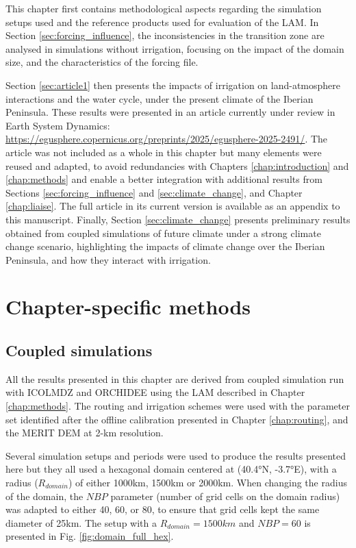 This chapter first contains methodological aspects regarding the simulation setups used and the reference products used for evaluation of the LAM. 
In Section \ref{sec:forcing_influence}, the inconsistencies in the transition zone are analysed in simulations without irrigation, focusing on the impact of the domain size, and the characteristics of the forcing file.

Section \ref{sec:article1} then presents the impacts of irrigation on land-atmosphere interactions and the water cycle, under the present climate of the Iberian Peninsula. These results were presented in an article currently under review in Earth System Dynamics: \url{https://egusphere.copernicus.org/preprints/2025/egusphere-2025-2491/}.
The article was not included as a whole in this chapter but many elements were reused and adapted, to avoid redundancies with Chapters \ref{chap:introduction} and \ref{chap:methods} and enable a better integration with additional results from Sections \ref{sec:forcing_influence} and \ref{sec:climate_change}, and Chapter \ref{chap:liaise}. The full article in its current version is available as an appendix to this manuscript.
Finally, Section \ref{sec:climate_change} presents preliminary results obtained from coupled simulations of future climate under a strong climate change scenario, highlighting the impacts of climate change over the Iberian Peninsula, and how they interact with irrigation.

\clearpage

\section{Chapter-specific methods}
\subsection{Coupled simulations}
All the results presented in this chapter are derived from coupled simulation run with ICOLMDZ and ORCHIDEE using the LAM described in Chapter \ref{chap:methods}. The routing and irrigation schemes were used with the parameter set identified after the offline calibration presented in Chapter \ref{chap:routing}, and the MERIT DEM at 2-km resolution.

Several simulation setups and periods were used to produce the results presented here but they all used a hexagonal domain centered at (40.4°N, -3.7°E), with a radius ($R_{domain}$) of either 1000km, 1500km or 2000km. When changing the radius of the domain, the $NBP$ parameter (number of grid cells on the domain radius) was adapted to either 40, 60, or 80, to ensure that grid cells kept the same diameter of 25km. The setup with a $R_{domain}=1500 km$ and $NBP=60$ is presented in Fig. \ref{fig:domain_full_hex}. 
 

